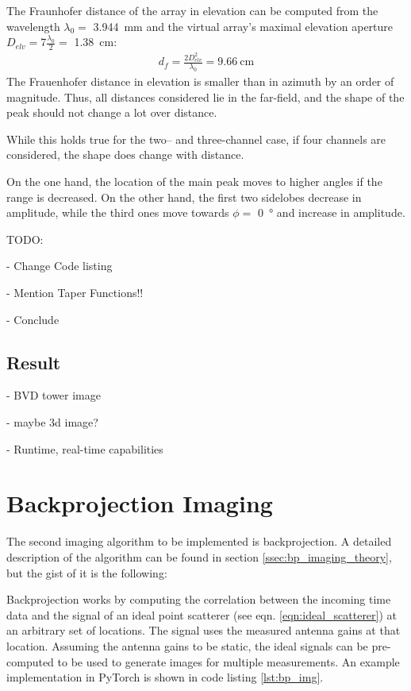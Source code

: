 The Fraunhofer distance of the array in elevation can be computed from the wavelength $\lambda_0=$ \SIlist{3.944}{\mm}
and the virtual array's maximal elevation aperture $D_{elv} = 7 \frac{\lambda_0}{2}=$ \SI{1.38}{\cm}:
\begin{align}
    d_f  = \frac{2D_{elv}^2}{\lambda_0}
    = \SI{9.66}{\cm}
\end{align}
The Frauenhofer distance in elevation is smaller than in azimuth by an order of magnitude.
Thus, all distances considered lie in the far-field,
and the shape of the peak should not change a lot over distance.

While this holds true for the two-- and three-channel case, if four channels are considered,
the shape does change with distance.

On the one hand, the location of the main peak moves to higher angles if the range is decreased.
On the other hand, the first two sidelobes decrease in amplitude,
while the third ones move towards $\phi=$ \SI{0}{\degree} and increase in amplitude.

TODO:

- Change Code listing

- Mention Taper Functions!!

- Conclude


\subsection{Result}

- BVD tower image

- maybe 3d image?

- Runtime, real-time capabilities


\section{Backprojection Imaging}

The second imaging algorithm to be implemented is backprojection.
A detailed description of the algorithm can be found in section \ref{ssec:bp_imaging_theory},
but the gist of it is the following:

Backprojection works by computing the correlation between the incoming time data
and the signal of an ideal point scatterer (see eqn. \ref{eqn:ideal_scatterer})
at an arbitrary set of locations. The signal uses the measured antenna gains at that location.
Assuming the antenna gains to be static,
the ideal signals can be pre-computed to be used to generate images for multiple measurements.
An example implementation in PyTorch is shown in code listing \ref{lst:bp_img}.

